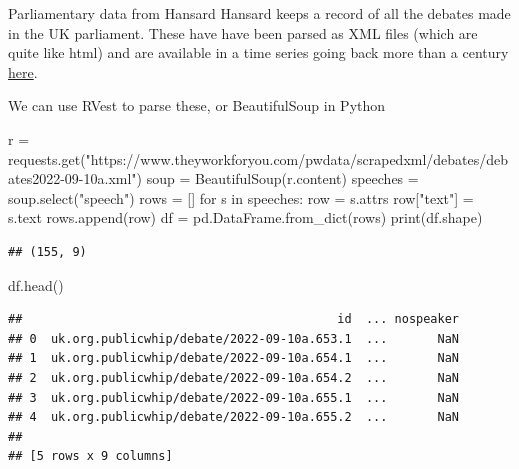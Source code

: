 \documentclass[
  10pt,
  ignorenonframetext,
  aspectratio=169]{beamer}
\newenvironment{Shaded}{\begin{snugshade}}{\end{snugshade}}
\newcommand{\BuiltInTok}[1]{\textcolor[rgb]{0.80,0.80,0.80}{#1}}
\newcommand{\ControlFlowTok}[1]{\textcolor[rgb]{0.94,0.87,0.69}{#1}}
\newcommand{\KeywordTok}[1]{\textcolor[rgb]{0.94,0.87,0.69}{#1}}
\newcommand{\NormalTok}[1]{\textcolor[rgb]{0.80,0.80,0.80}{#1}}
\newcommand{\OperatorTok}[1]{\textcolor[rgb]{0.94,0.94,0.82}{#1}}
\newcommand{\StringTok}[1]{\textcolor[rgb]{0.80,0.58,0.58}{#1}}
\begin{document}
\begin{frame}[fragile]{Parliamentary data from Hansard}
\protect\hypertarget{parliamentary-data-from-hansard-1}{}
Hansard keeps a record of all the debates made in the UK parliament.
These have have been parsed as XML files (which are quite like html) and
are available in a time series going back more than a century
\href{https://parser.theyworkforyou.com/hansard.html}{here}.

We can use RVest to parse these, or BeautifulSoup in Python

\scriptsize

\begin{Shaded}
\begin{Highlighting}[]

\NormalTok{r }\OperatorTok{=}\NormalTok{ requests.get(}\StringTok{"https://www.theyworkforyou.com/pwdata/scrapedxml/debates/debates2022{-}09{-}10a.xml"}\NormalTok{)}
\NormalTok{soup }\OperatorTok{=}\NormalTok{ BeautifulSoup(r.content)}
\NormalTok{speeches }\OperatorTok{=}\NormalTok{ soup.select(}\StringTok{"speech"}\NormalTok{)}
\NormalTok{rows }\OperatorTok{=}\NormalTok{ []}
\ControlFlowTok{for}\NormalTok{ s }\KeywordTok{in}\NormalTok{ speeches:}
\NormalTok{    row }\OperatorTok{=}\NormalTok{ s.attrs}
\NormalTok{    row[}\StringTok{"text"}\NormalTok{] }\OperatorTok{=}\NormalTok{ s.text}
\NormalTok{    rows.append(row)}
\NormalTok{df }\OperatorTok{=}\NormalTok{ pd.DataFrame.from\_dict(rows)}
\BuiltInTok{print}\NormalTok{(df.shape)}
\end{Highlighting}
\end{Shaded}

\begin{verbatim}
## (155, 9)
\end{verbatim}

\begin{Shaded}
\begin{Highlighting}[]
\NormalTok{df.head()}
\end{Highlighting}
\end{Shaded}

\begin{verbatim}
##                                            id  ... nospeaker
## 0  uk.org.publicwhip/debate/2022-09-10a.653.1  ...       NaN
## 1  uk.org.publicwhip/debate/2022-09-10a.654.1  ...       NaN
## 2  uk.org.publicwhip/debate/2022-09-10a.654.2  ...       NaN
## 3  uk.org.publicwhip/debate/2022-09-10a.655.1  ...       NaN
## 4  uk.org.publicwhip/debate/2022-09-10a.655.2  ...       NaN
## 
## [5 rows x 9 columns]
\end{verbatim}
\end{frame}
\end{document}
